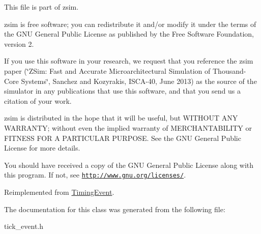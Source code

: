 This file is part of zsim.

zsim is free software; you can redistribute it and/or modify it under the terms of the G\-N\-U General Public License as published by the Free Software Foundation, version 2.

If you use this software in your research, we request that you reference the zsim paper (\char`\"{}\-Z\-Sim\-: Fast and Accurate Microarchitectural Simulation of
\-Thousand-\/\-Core Systems\char`\"{}, Sanchez and Kozyrakis, I\-S\-C\-A-\/40, June 2013) as the source of the simulator in any publications that use this software, and that you send us a citation of your work.

zsim is distributed in the hope that it will be useful, but W\-I\-T\-H\-O\-U\-T A\-N\-Y W\-A\-R\-R\-A\-N\-T\-Y; without even the implied warranty of M\-E\-R\-C\-H\-A\-N\-T\-A\-B\-I\-L\-I\-T\-Y or F\-I\-T\-N\-E\-S\-S F\-O\-R A P\-A\-R\-T\-I\-C\-U\-L\-A\-R P\-U\-R\-P\-O\-S\-E. See the G\-N\-U General Public License for more details.

You should have received a copy of the G\-N\-U General Public License along with this program. If not, see \href{http://www.gnu.org/licenses/}{\tt http\-://www.\-gnu.\-org/licenses/}. 

Reimplemented from \hyperlink{classTimingEvent_a55e7e2942d6607eb2a9dd484baf39070}{Timing\-Event}.



The documentation for this class was generated from the following file\-:\begin{DoxyCompactItemize}
\item 
tick\-\_\-event.\-h\end{DoxyCompactItemize}
